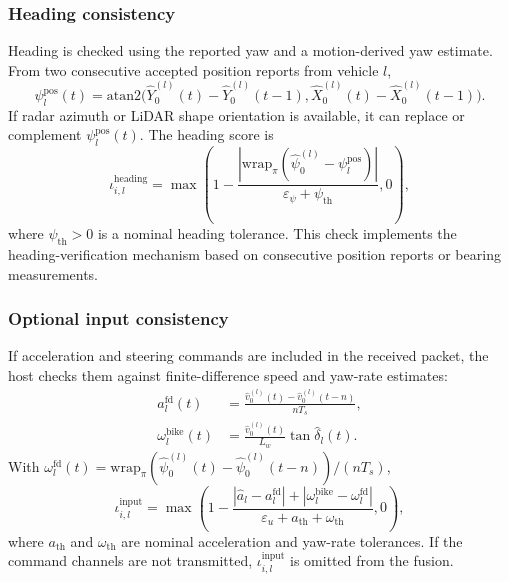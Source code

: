 \documentclass[letterpaper,journal]{IEEEtran}
\newtheorem{assumption}{\it Assumption}%
\begin{document}
\subsubsection{Heading consistency}
Heading is checked using the reported yaw and a motion-derived yaw estimate. From two consecutive accepted position reports from vehicle $l$,
\begin{equation*}
    \psi_{l}^{\mathrm{pos}}(t)=
    \mathrm{atan2}\big(\hat Y_0^{(l)}(t)-\hat Y_0^{(l)}(t-1),
    \hat X_0^{(l)}(t)-\hat X_0^{(l)}(t-1)\big).
\end{equation*}
If radar azimuth or LiDAR shape orientation is available, it can replace or complement $\psi_l^{\mathrm{pos}}(t)$. The heading score is
\begin{equation*}
    \iota_{i,l}^{\text{heading}} =
    \max\left(
    1-\frac{\left|\mathrm{wrap}_{\pi}(\hat{\psi}_0^{(l)}-\psi_l^{\mathrm{pos}})\right|}
    {\varepsilon_{\psi}+\psi_{\mathrm{th}}},
    0
    \right),
\end{equation*}
where $\psi_{\mathrm{th}}>0$ is a nominal heading tolerance. This check implements the heading-verification mechanism based on consecutive position reports or bearing measurements.

\subsubsection{Optional input consistency}
If acceleration and steering commands are included in the received packet, the host checks them against finite-difference speed and yaw-rate estimates:
\begin{align*}
    a_{l}^{\mathrm{fd}}(t)
    &=\frac{\hat v_0^{(l)}(t)-\hat v_0^{(l)}(t-n)}{nT_s},\\
    \omega_l^{\mathrm{bike}}(t)
    &=\frac{\hat v_0^{(l)}(t)}{L_w}\tan\hat\delta_l(t).
\end{align*}
With $\omega_l^{\mathrm{fd}}(t)=\mathrm{wrap}_{\pi}(\hat\psi_0^{(l)}(t)-\hat\psi_0^{(l)}(t-n))/(nT_s)$,
\begin{equation*}
    \iota_{i,l}^{\text{input}} =
    \max\left(
    1 -
    \frac{|\hat a_l-a_l^{\mathrm{fd}}|+|\omega_l^{\mathrm{bike}}-\omega_l^{\mathrm{fd}}|}
    {\varepsilon_u+a_{\mathrm{th}}+\omega_{\mathrm{th}}},
    0
    \right),
\end{equation*}
where $a_{\mathrm{th}}$ and $\omega_{\mathrm{th}}$ are nominal acceleration and yaw-rate tolerances. If the command channels are not transmitted, $\iota_{i,l}^{\text{input}}$ is omitted from the fusion.
\end{document}
